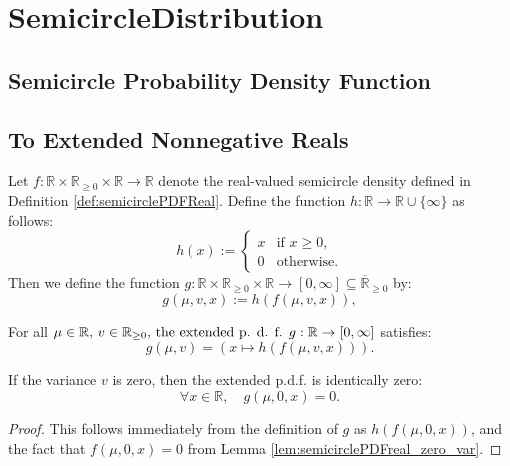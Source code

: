 \chapter{SemicircleDistribution}
\section{Semicircle Probability Density Function}

\section{To Extended Nonnegative Reals}



\begin{definition}
  \label{def:semicirclePDF}
  \mathlibok 
  Let $f : \mathbb{R} \times \mathbb{R}_{\geq 0} \times \mathbb{R} \to \mathbb{R}$ denote the real-valued semicircle density defined in Definition \ref{def:semicirclePDFReal}. Define the function $h: \mathbb{R} \to \mathbb{R} \cup \{\infty\} $ as follows:
  $$
  h(x) := \begin{cases}
x & \text{if } x \ge 0, \\
0 & \text{otherwise}.
\end{cases}
  $$ 
  Then we define the function $ g : \mathbb{R} \times \mathbb{R}_{\geq 0} \times \mathbb{R} \to [0,\infty] \subseteq \overline{\mathbb{R}}_{\ge 0}$ by:
    $$
    g(\mu,v,x) := h(f(\mu,v,x)),
    $$
\end{definition}

\begin{lemma}
  \label{lem:semicirclePDF_def}
  \mathlibok
  For all $\mu \in \mathbb{R} \), \( v \in \mathbb{R}_{\geq 0} \), the extended p. d. f. \( g : \mathbb{R} \to [0,\infty]$  satisfies:
  $$
    g(\mu,v) = \left( x \mapsto h(f(\mu,v,x)) \right).
  $$
\end{lemma}

\begin{lemma}
  \label{lem:semicirclePDF_zero_var}
  \mathlibok
  If the variance $v$ is zero, then the extended p.d.f. is identically zero:
 $$ 
    \forall x \in \mathbb{R}, \quad g(\mu,0,x) = 0.
 $$ 
\end{lemma}
\begin{proof}
  This follows immediately from the definition of $g$ as $h(f(\mu,0,x))$, and the fact that $f(\mu,0,x) = 0$ from Lemma \ref{lem:semicirclePDFreal_zero_var}.
\end{proof}

